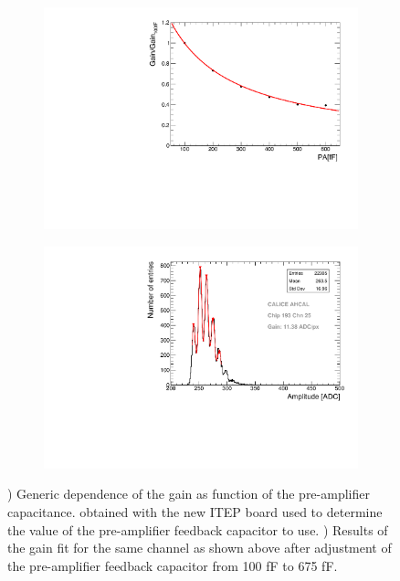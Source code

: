 \begin{figure}[htbp!]
  \centering
  \begin{subfigure}[t]{0.49\textwidth}
    \includegraphics[width=1.\linewidth]{../Thesis_Plots/Commissioning/Plots/GainvsPA.pdf}
    \caption{} \label{fig:PA_curve}
  \end{subfigure}
  \hfill
  \begin{subfigure}[t]{0.49\textwidth}
    \includegraphics[width=1.\linewidth]{../Thesis_Plots/Commissioning/Plots/Gain675fF_MainzHBU4.pdf}
    \caption{} \label{fig:Gain675fF}
  \end{subfigure}
  \caption{) Generic dependence of the gain as function of the pre-amplifier capacitance. obtained with the new ITEP board used to determine the value of the pre-amplifier feedback capacitor to use. ) Results of the gain fit for the same channel as shown above after adjustment of the pre-amplifier feedback capacitor from 100 fF to 675 fF.}
\end{figure}

